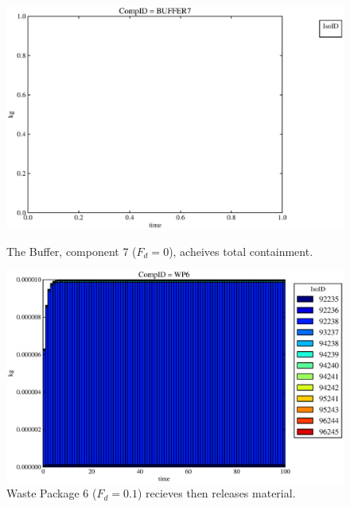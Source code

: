 \begin{figure}[ht]
\begin{minipage}[b]{0.45\linewidth}
  \includegraphics[width=\textwidth]{./chapters/demonstration/base/lpPFMII3.eps}
  \caption[Case LPPFMII Buffer Contaminants]{
    The Buffer, component 7 ($F_d=0$), acheives total containment.
    }
  \label{fig:lpPFMIIbuff}

\end{minipage}
\hspace{0.05\linewidth}
\begin{minipage}[b]{0.45\linewidth}
  \includegraphics[width=\textwidth]{./chapters/demonstration/base/lpPFMII2.eps}
  \caption[Case LPPFMII Waste Package Contaminants.]{ 
    Waste Package 6 ($F_d = 0.1$) recieves then releases material. 
    }
  \label{fig:lpPFMIIwp6}


\end{minipage}
\end{figure}
